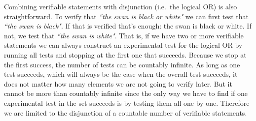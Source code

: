 	Combining verifiable statements with disjunction (i.e.~the logical OR) is also straightforward. To verify that \emph{``the swan is black or white"} we can first test that \emph{``the swan is black"}. If that is verified that's enough: the swan is black or white. If not, we test that \emph{``the swan is white"}. That is, if we have two or more verifiable statements we can always construct an experimental test for the logical OR by running all tests and stopping at the first one that succeeds. Because we stop at the first success, the number of tests can be countably infinite. As long as one test succeeds, which will always be the case when the overall test succeeds, it does not matter how many elements we are not going to verify later. But it cannot be more than countably infinite since the only way we have to find if one experimental test in the set succeeds is by testing them all one by one. Therefore we are limited to the disjunction of a countable number of verifiable statements.
	
